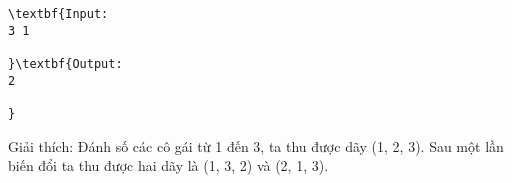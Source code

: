 \begin{verbatim}
\textbf{Input:
3 1

}\textbf{Output:
2

}\end{verbatim}

Giải thích: Đánh số các cô gái từ 1 đến 3, ta thu được dãy (1, 2, 3). Sau một lần biến đổi ta thu được hai dãy là (1, 3, 2) và (2, 1, 3).\textbf{
}